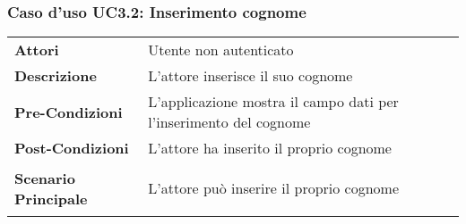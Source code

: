 \subsubsection{Caso d'uso UC3.2: Inserimento cognome}
\label{UC3_2}

\begin{longtable}{ l | p{11cm}}
	\hline
	\rowcolor{Gray}
	 \multicolumn{2}{c}{UC3.2 - Inserimento cognome} \\
	 \hline
	\textbf{Attori} & Utente non autenticato \\
	\textbf{Descrizione} & L'attore inserisce il suo cognome \\
	\textbf{Pre-Condizioni} & L'applicazione mostra il campo dati per l'inserimento del cognome \\
	\textbf{Post-Condizioni} & L'attore ha inserito il proprio cognome \\
	\textbf{Scenario Principale} & \begin{enumerate*}[label=(\arabic*.),itemjoin={\newline}]
		\item L'attore può inserire il proprio cognome
	\end{enumerate*}\\
\end{longtable}